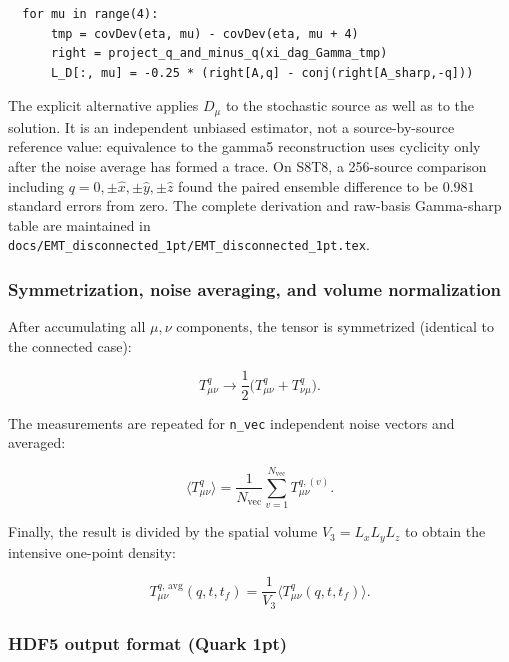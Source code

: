 \documentclass[11pt,a4paper]{article}
\newcommand{\code}[1]{\texttt{#1}}
\begin{document}
\begin{verbatim}
  for mu in range(4):
      tmp = covDev(eta, mu) - covDev(eta, mu + 4)
      right = project_q_and_minus_q(xi_dag_Gamma_tmp)
      L_D[:, mu] = -0.25 * (right[A,q] - conj(right[A_sharp,-q]))
\end{verbatim}
The explicit alternative applies \(D_\mu\) to the stochastic source as well
as to the solution.  It is an independent unbiased estimator, not a
source-by-source reference value: equivalence to the gamma5 reconstruction
uses cyclicity only after the noise average has formed a trace.  On S8T8, a
256-source comparison including \(q=0,\pm\hat x,\pm\hat y,\pm\hat z\) found
the paired ensemble difference to be \(0.981\) standard errors from zero.
The complete derivation and raw-basis Gamma-sharp table are maintained in
\code{docs/EMT\_disconnected\_1pt/EMT\_disconnected\_1pt.tex}.

\subsubsection{Symmetrization, noise averaging, and volume normalization}

After accumulating all $\mu,\nu$ components, the tensor is symmetrized (identical to the connected case):

\begin{equation}
  T_{\mu\nu}^q \to \frac{1}{2}\big( T_{\mu\nu}^q + T_{\nu\mu}^q \big).
\end{equation}

The measurements are repeated for \code{n\_vec} independent noise vectors and averaged:

\begin{equation}
  \langle T_{\mu\nu}^q \rangle
    = \frac{1}{N_{\text{vec}}} \sum_{v=1}^{N_{\text{vec}}}
      T_{\mu\nu}^{q,(v)}.
\end{equation}

Finally, the result is divided by the spatial volume $V_3 = L_x L_y L_z$ to obtain the intensive one-point density:

\begin{equation}
  T_{\mu\nu}^{q,\,\text{avg}}(q, t, t_f)
    = \frac{1}{V_3} \langle T_{\mu\nu}^q (q, t, t_f) \rangle.
\end{equation}

\subsubsection{HDF5 output format (Quark 1pt)}
\end{document}
